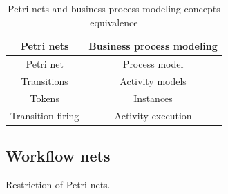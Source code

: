\begin{table}[H]
    \centering
    \begin{tabular}{c|c}
        \textbf{Petri nets} & \textbf{Business process modeling} \\
        \hline
        Petri net & Process model \\
        Transitions & Activity models \\
        Tokens & Instances \\
        Transition firing & Activity execution \\
    \end{tabular}
    \caption{Petri nets and business process modeling concepts equivalence}
\end{table}


\subsection{Workflow nets}
Restriction of Petri nets.

